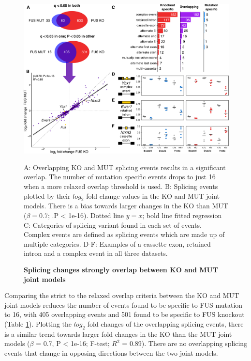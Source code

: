 \begin{figure}[t]
	\centering
	\includegraphics[width=\textwidth]{Figures/06_fus_meta/splicing_multi.png}
	\caption{\textbf{Splicing changes  strongly overlap between KO and MUT joint models}}
	A: Overlapping KO and MUT splicing events results in a significant overlap. The number of mutation specific events drops to just 16 when a more relaxed overlap threshold is used.
	B: Splicing events plotted by their $log_2$ fold change values in the KO and MUT joint models. There is a bias towards larger changes in the KO than MUT ($\beta = 0.7$; .P < 1e-16). Dotted line $y=x$; bold line fitted regression
	C: Categories of splicing variant found in each set of events. Complex events are defined as splicing events which are made up of multiple categories.
	D-F: Examples of a cassette exon, retained intron and a complex event in all three datasets. 
	\label{fig:fus_splicing_multi}
\end{figure}

Comparing the strict to the relaxed overlap criteria between the KO and MUT joint models reduces the number of events found to be specific to FUS mutation to 16, with 405 overlapping events and 501 found to be specific to FUS knockout (Table \ref{fig:fus_splicing_multi}). 
Plotting the $log_2$ fold changes of the overlapping splicing events, there is a similar trend towards larger fold changes in the KO than the MUT joint models ($\beta$ = 0.7, P < 1e-16; F-test; $R^2$ = 0.89). 
There are no overlapping splicing events that change in opposing directions between the two joint models.

